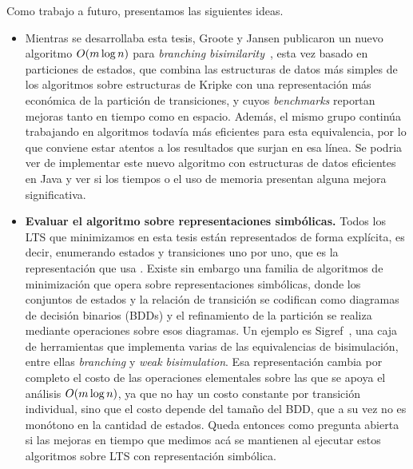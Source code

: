 \vspace{.5cm}
Como trabajo a futuro, presentamos las siguientes ideas.

\begin{itemize}

    \item Mientras se desarrollaba esta tesis, Groote y Jansen
    publicaron un nuevo algoritmo ${O\!\left(m \log n\right)}$ para \textit{branching
    bisimilarity}~\cite{groote2025}, esta vez basado en particiones de estados, que combina las estructuras
    de datos más simples de los algoritmos sobre estructuras de Kripke con una representación
    más económica de la partición de transiciones, y cuyos \textit{benchmarks} reportan mejoras
     tanto en tiempo como en espacio. Además, el mismo grupo continúa
    trabajando en algoritmos todavía más eficientes para esta equivalencia, por lo que conviene
    estar atentos a los resultados que surjan en esa línea. Se podria ver de implementar este nuevo algoritmo con estructuras de datos eficientes
    en Java y ver si los tiempos o el uso de memoria presentan alguna mejora significativa.

    \item \textbf{Evaluar el algoritmo sobre representaciones simbólicas.} Todos los LTS que
    minimizamos en esta tesis están representados de forma explícita, es decir, enumerando
    estados y transiciones uno por uno, que es la representación que usa \MTSA{}. Existe sin
    embargo una familia de algoritmos de minimización que opera sobre representaciones
    simbólicas, donde los conjuntos de estados y la relación de transición se codifican como
    diagramas de decisión binarios (BDDs) y el refinamiento de la partición se realiza mediante
    operaciones sobre esos diagramas. Un ejemplo es Sigref~\cite{sigref}, una caja de herramientas
    que implementa varias de las
    equivalencias de bisimulación, entre ellas \textit{branching} y
    \textit{weak bisimulation}. Esa representación cambia por completo el
    costo de las operaciones elementales sobre las que se apoya el análisis ${O\!\left(m \log n\right)}$,
    ya que no hay un costo constante por transición individual, sino que el costo depende del tamaño
    del BDD, que a su vez no es monótono en la cantidad de estados. Queda entonces como pregunta
    abierta si las mejoras en tiempo que medimos acá se mantienen al ejecutar estos algoritmos
    sobre LTS con representación simbólica.
\end{itemize}

